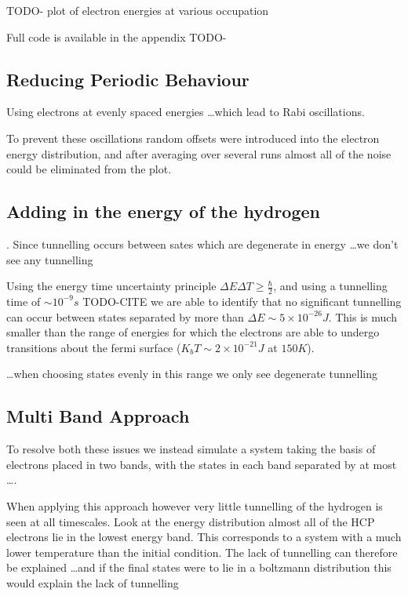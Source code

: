 TODO- plot of electron energies at various occupation

Full code is available in the appendix TODO-


\subsection{Reducing Periodic Behaviour}
Using electrons at evenly spaced energies \ldots which lead to Rabi oscillations.

To prevent these oscillations random offsets were introduced
into the electron energy distribution, and after
averaging over several runs almost all of the
noise could be eliminated from the plot.

\subsection{}

\subsection{Adding in the energy of the hydrogen}

. Since tunnelling occurs between sates which are
degenerate in energy \ldots we don't see any tunnelling

Using the energy time uncertainty principle
\(\Delta{}E\Delta{}T \geq \frac{\hbar}{2}\), and
using a tunnelling time of \(\sim 10^{-9}s\) TODO-CITE
we are able to identify that no significant tunnelling
can occur between states separated by more than
\(\Delta{}E \sim 5\times{}10^{-26} J\). This is
much smaller than the range of energies for
which the electrons are able to undergo
transitions about the fermi surface
(\(K_b T \sim 2 \times 10^{-21}J\) at \(150K\)).


\ldots when choosing states evenly in this
range we only see degenerate tunnelling

\subsection{Multi Band Approach}
To resolve both these issues we instead simulate a system
taking the basis of electrons placed in two bands, with
the states in each band separated by at most \ldots.


When applying this approach however very
little tunnelling of the hydrogen is seen at all timescales.
Look at the energy distribution almost all
of the HCP electrons lie in the lowest energy band.
This corresponds to a system with a much lower
temperature than the initial condition.
The lack of tunnelling can therefore be explained
\ldots and if
the final states were to lie in a boltzmann  distribution
this would explain the lack of tunnelling

